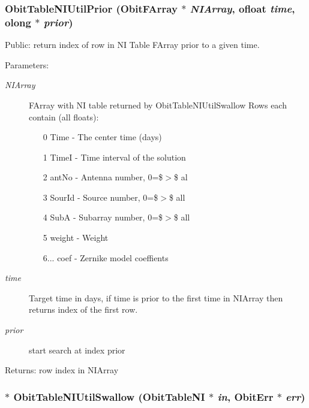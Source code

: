 \subsubsection{ Obit\-Table\-NIUtil\-Prior ({\bf Obit\-FArray} $\ast$ {\em NIArray}, {\bf ofloat} {\em time}, {\bf olong} $\ast$ {\em prior})}\label{ObitTableNIUtil_8h_a1}


Public: return index of row in NI Table FArray prior to a given time. 

\begin{Desc}
\item[Parameters:]
\begin{description}
\item[{\em NIArray}]FArray with NI table returned by Obit\-Table\-NIUtil\-Swallow Rows each contain (all floats): \begin{itemize}
\item [0] Time - The center time (days) \item [1] Time\-I - Time interval of the solution \item [2] ant\-No - Antenna number, 0=\$$>$\$ al \item [3] Sour\-Id - Source number, 0=\$$>$\$ all \item [4] Sub\-A - Subarray number, 0=\$$>$\$ all \item [5] weight - Weight \item [6...] coef - Zernike model coeffients \end{itemize}
\item[{\em time}]Target time in days, if time is prior to the first time in NIArray then returns index of the first row. \item[{\em prior}]start search at index prior \end{description}
\end{Desc}
\begin{Desc}
\item[Returns:]row index in NIArray \end{Desc}
\subsubsection{$\ast$ Obit\-Table\-NIUtil\-Swallow ({\bf Obit\-Table\-NI} $\ast$ {\em in}, {\bf Obit\-Err} $\ast$ {\em err})}\label{ObitTableNIUtil_8h_a0}


